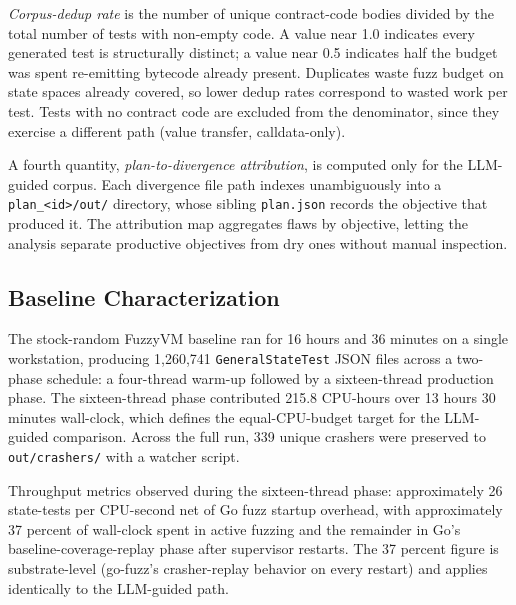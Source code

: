 \documentclass[conference]{IEEEtran}
\begin{document}
\emph{Corpus-dedup rate} is the number of unique contract-code bodies divided by the total number of tests with non-empty code. A value near 1.0 indicates every generated test is structurally distinct; a value near 0.5 indicates half the budget was spent re-emitting bytecode already present. Duplicates waste fuzz budget on state spaces already covered, so lower dedup rates correspond to wasted work per test. Tests with no contract code are excluded from the denominator, since they exercise a different path (value transfer, calldata-only).

A fourth quantity, \emph{plan-to-divergence attribution}, is computed only for the LLM-guided corpus. Each divergence file path indexes unambiguously into a \texttt{plan\_<id>/out/} directory, whose sibling \texttt{plan.json} records the objective that produced it. The attribution map aggregates flaws by objective, letting the analysis separate productive objectives from dry ones without manual inspection.

\subsection{Baseline Characterization}

The stock-random FuzzyVM baseline ran for 16 hours and 36 minutes on a single workstation, producing 1,260,741 \texttt{GeneralStateTest} JSON files across a two-phase schedule: a four-thread warm-up followed by a sixteen-thread production phase. The sixteen-thread phase contributed 215.8 CPU-hours over 13 hours 30 minutes wall-clock, which defines the equal-CPU-budget target for the LLM-guided comparison. Across the full run, 339 unique crashers were preserved to \texttt{out/crashers/} with a watcher script.

Throughput metrics observed during the sixteen-thread phase: approximately 26 state-tests per CPU-second net of Go fuzz startup overhead, with approximately 37 percent of wall-clock spent in active fuzzing and the remainder in Go's baseline-coverage-replay phase after supervisor restarts. The 37 percent figure is substrate-level (go-fuzz's crasher-replay behavior on every restart) and applies identically to the LLM-guided path.
\end{document}
